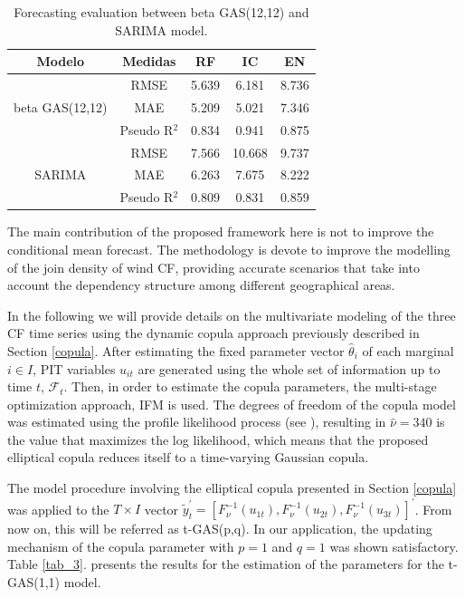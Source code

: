 \documentclass[a4paper]{IEEEtran}
\begin{document}
\begin{table}[htbp]
\centering
\caption{Forecasting evaluation between beta GAS(12,12) and SARIMA model.}
\begin{tabular}{c|cccc}
\hline
   Modelo                 & Medidas   & RF    & IC    & EN    \\ \hline
                          & RMSE      & 5.639 & 6.181 & 8.736 \\
beta GAS(12,12)           & MAE       & 5.209 & 5.021 & 7.346  \\
                       & Pseudo R$^{2}$ & 0.834 & 0.941 & 0.875 \\ \hline
                       & RMSE      & 7.566 & 10.668 & 9.737 \\
SARIMA                 & MAE       & 6.263  & 7.675 & 8.222 \\
                       & Pseudo R$^{2}$ & 0.809 & 0.831 & 0.859\\ \hline
\end{tabular}
\label{tablefor}
\end{table}

The main contribution of the proposed framework here is not to improve the conditional mean forecast. The methodology is devote to improve the modelling of the join density of wind CF, providing accurate scenarios that take into account the dependency structure among different geographical areas.


In the following we will provide details on the multivariate modeling of the three CF time series using the dynamic copula approach previously described in Section \ref{copula}. After estimating the fixed parameter vector $\hat{\theta}_{i}$ of each marginal $i \in I$, PIT variables $u_{it}$ are generated using the whole set of information up to time $t$, $\mathcal{F}_{t}$. Then, in order to estimate the copula parameters, the multi-stage optimization approach, IFM is used. The degrees of freedom of the copula model was estimated using the profile likelihood process (see \cite{murphy2000profile}), resulting in $\hat{\nu}=340$ is the value that maximizes the log likelihood, which means that the proposed elliptical copula reduces itself to a time-varying Gaussian copula. %

The model procedure involving the elliptical copula presented in Section \ref{copula} was applied to the $T \times I$ vector $\tilde{y}_{t}^{'}=[F_{\nu}^{-1}(u_{1t}), F_{\nu}^{-1}(u_{2t}), F_{\nu}^{-1}(u_{3t})]^{'}$. From now on, this will be referred as t-GAS(p,q). In our application, the updating mechanism of the copula parameter with $p=1$ and $q=1$ was shown satisfactory. Table \ref{tab_3}. presents the results for the estimation of the parameters for the t-GAS(1,1) model.%
\end{document}
